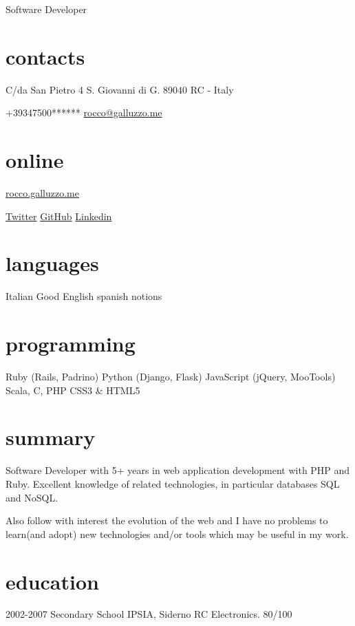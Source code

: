 \documentclass[print]{cv}
\begin{document}
       {Software Developer}

\begin{aside}%
\section{contacts}
    C/da San Pietro 4
    S. Giovanni di G.
89040 RC - Italy\par\smallskip%
+39347500******
	\href{mailto:rocco@galluzzo.me}{rocco@galluzzo.me}
	\section{online}
	\href{http://rocco.galluzzo.me}{rocco.galluzzo.me}
         \par\smallskip%
	\href{http://twitter.com/byterussian}{Twitter}
           \href{https://github.com/byterussian}{GitHub}
           \href{http://www.linkedin.com/in/roccogalluzzo}{Linkedin}
  \section{languages}
    Italian
    Good English
    spanish notions
  \section{programming}
    Ruby
    (Rails, Padrino)
    Python
    (Django, Flask)
    JavaScript
    (jQuery, MooTools)
    Scala, C, PHP
    CSS3 \& HTML5
\end{aside}

\section{summary}
Software Developer with 5+ years in web application development with
PHP and Ruby. Excellent knowledge of related technologies, in particular
databases SQL and NoSQL.

Also follow with interest the evolution of the web and I have no problems to learn(and adopt)
new technologies and/or tools which may be useful in my work.
\section{education}

\begin{entrylist}

  \entry
    {2002-2007}
    {Secondary School}
    {IPSIA, Siderno RC}
    {Electronics. 80/100}

\end{entrylist}
\end{document}
